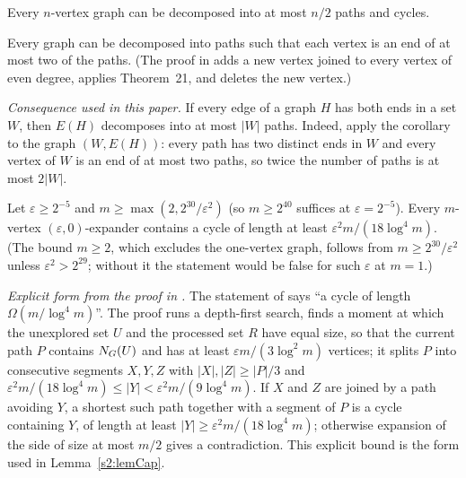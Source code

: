 \begin{citedresult}\label{s1:citThm21}
Every $n$-vertex graph can be decomposed into at most $n/2$ paths and
cycles.
\end{citedresult}

\begin{citedresult}[{\cite[Corollary~22]{BM}}]\label{s1:citCor22}
Every graph can be decomposed into paths such that each vertex is an end of at
most two of the paths. (The proof in \cite{BM} adds a new vertex joined to every
vertex of even degree, applies Theorem~21, and deletes the new
vertex.)

\emph{Consequence used in this paper.} If every edge of a graph $H$ has both
ends in a set $W$, then $E(H)$ decomposes into at most $|W|$ paths. Indeed, apply
the corollary to the graph $(W,E(H))$: every path has two distinct ends in $W$
and every vertex of $W$ is an end of at most two paths, so twice the number of
paths is at most $2|W|$.
\end{citedresult}

\begin{citedresult}\label{s1:citLem25}
Let $\varepsilon\ge2^{-5}$ and $m\ge\max(2,2^{30}/\varepsilon^2)$ (so
$m\ge2^{40}$ suffices at $\varepsilon=2^{-5}$). Every $m$-vertex
$(\varepsilon,0)$-expander contains a cycle of length at least
$\varepsilon^2m/(18\log^4m)$. (The bound $m\ge2$, which excludes the
one-vertex graph, follows from $m\ge2^{30}/\varepsilon^2$ unless
$\varepsilon^2>2^{29}$; without it the statement would be false for such
$\varepsilon$ at $m=1$.)

\emph{Explicit form from the proof in \cite{BM}.} The statement of \cite{BM}
says ``a cycle of length $\Omega(m/\log^4m)$''. The proof runs a depth-first
search, finds a moment at which the unexplored set $U$ and the processed set $R$
have equal size, so that the current path $P$ contains
$N_G(U)$ and has at least $\varepsilon m/(3\log^2m)$ vertices; it splits $P$
into consecutive segments $X,Y,Z$ with $|X|,|Z|\ge|P|/3$ and
$\varepsilon^2m/(18\log^4m)\le|Y|<\varepsilon^2m/(9\log^4m)$. If $X$ and $Z$
are joined by a path avoiding $Y$, a shortest such path together with a segment
of $P$ is a cycle containing $Y$, of length at least $|Y|\ge
\varepsilon^2m/(18\log^4m)$; otherwise expansion of the side of size at most
$m/2$ gives a contradiction. This explicit bound is the form used in
Lemma~\ref{s2:lemCap}.
\end{citedresult}

